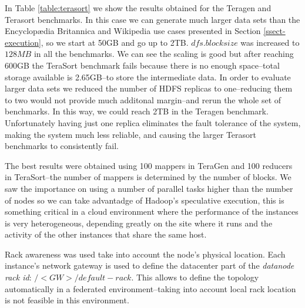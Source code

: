 

In Table \ref{table:terasort} we show the results obtained for the Teragen and Terasort benchmarks. In this case we can generate much larger data sets than the Encyclop{\ae}dia Britannica and Wikipedia use cases presented in Section \ref{ssect-execution}, so we start at 50GB and go up to 2TB. $dfs.blocksize$ was increased to $128MB$ in all the benchmarks. We can see the scaling is good but after reaching 600GB the TeraSort benchmark fails because there is no enough space--total storage available is 2.65GB--to store the intermediate data. In order to evaluate larger data sets we reduced the number of HDFS replicas to one--reducing them to two would not provide much additonal margin--and rerun the whole set of benchmarks. In this way, we could reach 2TB in the Teragen benchmark. Unfortunately having just one replica eliminates the fault tolerance of the system, making the system much less reliable, and causing the larger Terasort benchmarks to consistently fail. 

The best results were obtained using 100 mappers in TeraGen and 100 reducers in TeraSort--the number of mappers is determined by the number of blocks. We saw the importance on using a number of parallel tasks higher than the number of nodes so we can take advantadge of Hadoop's speculative execution, this is something critical in a cloud environment where the performance of the instances is very heterogeneous, depending greatly on the site where it runs and the activity of the other instances that share the same host.

Rack awareness was used take into account the node's physical location. Each instance's network gateway is used to define the datacenter part of the \emph{datanode rack id}: $/<GW>/default-rack$. This allows to define the topology automatically in a federated environment--taking into account local rack location is not feasible in this environment.

